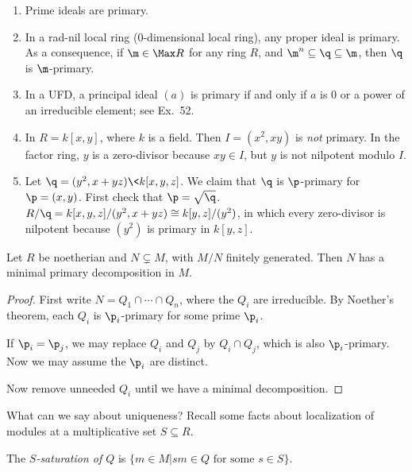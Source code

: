  \begin{example}
  \begin{enumerate}
   \item Prime ideals are primary.

   \item In a rad-nil local ring (0-dimensional local ring), any proper ideal is primary.
   As a consequence, if $\m\in \Max R$ for any ring $R$, and $\m^n\subseteq \q\subseteq
   \m$, then $\q$ is $\m$-primary.

   \item In a UFD, a principal ideal $(a)$ is primary if and only if $a$ is 0 or a power
   of an irreducible element; see Ex.\ 52.

   \item In $R=k[x,y]$, where $k$ is a field. Then $I=(x^2,xy)$ is \emph{not} primary. In
   the factor ring, $y$ is a zero-divisor because $xy\in I$, but $y$ is not nilpotent
   modulo $I$.

   \item Let $\q=(y^2,x+yz)\< k[x,y,z]$. We claim that $\q$ is $\p$-primary for
   $\p=(x,y)$. First check that $\p=\sqrt \q$. $R/\q = k[x,y,z]/(y^2,x+yz)\cong
   k[y,z]/(y^2)$, in which every zero-divisor is nilpotent because $(y^2)$ is primary in
   $k[y,z]$.
  \end{enumerate}
  \vspace*{-1.7\baselineskip}
 \end{example}
 \begin{theorem}
   Let $R$ be noetherian and $N\subsetneq M$, with $M/N$ finitely generated. Then $N$ has
   a minimal primary decomposition in $M$.
 \end{theorem}
 \begin{proof}
   First write $N=Q_1\cap \cdots \cap Q_n$, where the $Q_i$ are irreducible. By Noether's
   theorem, each $Q_i$ is $\p_i$-primary for some prime $\p_i$.

   If $\p_i=\p_j$, we may replace $Q_i$ and $Q_j$ by $Q_i\cap Q_j$, which is also
   $\p_i$-primary. Now we may assume the $\p_i$ are distinct.

   Now remove unneeded $Q_i$ until we have a minimal decomposition.
 \end{proof}
 What can we say about uniqueness? Recall some facts about localization of modules at a
 multiplicative set $S\subseteq R$.
 \begin{definition}
   The \emph{$S$-saturation of $Q$} is $\{m\in M|sm\in Q\text{ for some }s\in S\}$.
 \end{definition}
